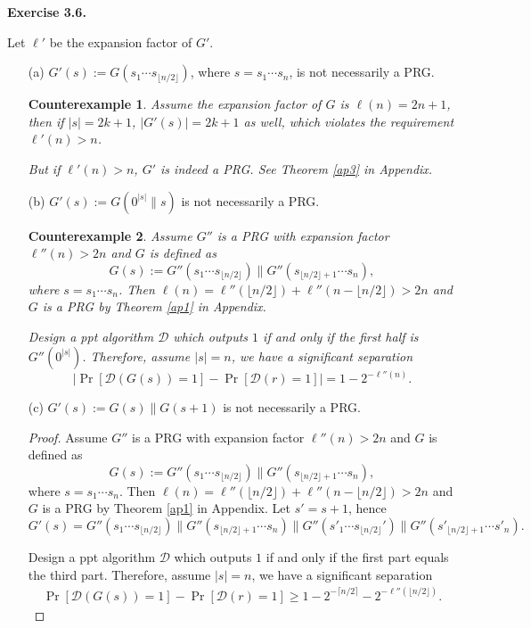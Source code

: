 \documentclass[a4paper]{article}
\newtheorem*{proof}{Proof}
\newtheorem*{counterexample}{Counterexample}
\newenvironment{exercise}[1]{
	\par
	\noindent\textbf{Exercise #1.}\quad
}{
	\par
	\bigskip
}
\newcommand{\sbra}[1]{\left[ #1 \right]}
\newcommand{\ppt}{{\sc ppt} }
\begin{document}
\begin{exercise}{3.6}
Let $\ell'$ be the expansion factor of $G'$.
\begin{enumerate}
\item[(a)] $G'(s):=G(s_1\cdots s_{\lfloor n/2\rfloor})$, where $s=s_1\cdots s_n$, is not necessarily a PRG.
\begin{counterexample}
    Assume the expansion factor of $G$ is $\ell(n)=2n+1$, then if $|s|=2k+1$, $|G'(s)|=2k+1$ as well, 
    which violates the requirement $\ell'(n)>n$.

    But if $\ell'(n)>n$, $G'$ is indeed a PRG. See Theorem \ref{ap3} in Appendix.
\end{counterexample}
\item[(b)] $G'(s):=G(0^{|s|}\|s)$ is not necessarily a PRG.
\begin{counterexample}
    Assume $G''$ is a PRG with expansion factor $\ell''(n)>2n$ and $G$ is defined as
    $$
        G(s):=G''(s_1\cdots s_{\lfloor n/2\rfloor})\|G''(s_{\lfloor n/2\rfloor+1}\cdots s_n),
    $$
    where $s=s_1\cdots s_n$. 
    Then $\ell(n)=\ell''(\lfloor n/2\rfloor)+\ell''(n-\lfloor n/2\rfloor)>2n$ and $G$ is a PRG by Theorem \ref{ap1} in Appendix.

    Design a \ppt algorithm $\mathcal D$ which outputs $1$ if and only if the first half is 
    $G''(0^{|s|})$. Therefore, assume $|s|=n$, we have a significant separation
    $$
        \Big|\Pr\sbra{\mathcal D(G(s))=1}-\Pr\sbra{\mathcal D(r)=1}\Big|=1-2^{-\ell''(n)}.
    $$
\end{counterexample}
\item[(c)] $G'(s):=G(s)\|G(s+1)$ is not necessarily a PRG.
\begin{proof}
    Assume $G''$ is a PRG with expansion factor $\ell''(n)>2n$ and $G$ is defined as
    $$
        G(s):=G''(s_1\cdots s_{\lfloor n/2\rfloor})\|G''(s_{\lfloor n/2\rfloor+1}\cdots s_n),
    $$
    where $s=s_1\cdots s_n$. 
    Then $\ell(n)=\ell''(\lfloor n/2\rfloor)+\ell''(n-\lfloor n/2\rfloor)>2n$ and $G$ is a PRG by Theorem \ref{ap1} in Appendix.
    Let $s'=s+1$, hence
    $$
    G'(s)=G''(s_1\cdots s_{\lfloor n/2\rfloor})\|G''(s_{\lfloor n/2\rfloor+1}\cdots s_n)
    \|G''(s'_1\cdots s_{\lfloor n/2\rfloor}')\|G''(s'_{\lfloor n/2\rfloor+1}\cdots s'_n).
    $$

    Design a \ppt algorithm $\mathcal D$ which outputs $1$ if and only if the first part equals the third part.
    Therefore, assume $|s|=n$, we have a significant separation
    \begin{align*}
        \Pr\sbra{\mathcal D(G(s))=1}-\Pr\sbra{\mathcal D(r)=1}\geq1-2^{-\lceil n/2\rceil}-2^{-\ell''(\lfloor n/2\rfloor)}.
    \end{align*}
\end{proof}
\end{enumerate}
\end{exercise}
\end{document}
